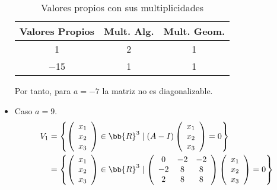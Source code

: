 \begin{ejercicio}
\begin{itemize}
           \begin{table}[H]
                \centering
                \begin{tabular}{c|c|c}
                    Valores Propios & Mult. Alg. & Mult. Geom. \\ \hline 
                    1 & 2 & 1\\
                    $-$15 & 1 & 1\\
                \end{tabular}
                \caption{Valores propios con sus multiplicidades}
            \end{table}
            Por tanto, para $a=-7$ la matriz no es diagonalizable.
            
        \item Caso $a=9$.
           \begin{equation*}\begin{split}
               V_{1} & = \left\{ \left(\begin{array}{c}
                    x_1 \\
                    x_2 \\
                    x_3
               \end{array}\right) \in \bb{R}^3 \mid (A-I)\left(\begin{array}{c}
                    x_1 \\
                    x_2 \\
                    x_3
               \end{array}\right) = 0 \right\} \\
               & = \left\{ \left(\begin{array}{c}
                    x_1 \\
                    x_2 \\
                    x_3
               \end{array}\right) \in \bb{R}^3 \mid \left( \begin{array}{ccc}
                0 & -2 & -2 \\
                -2 & 8 & 8 \\
                2 & 8 & 8 \\
            \end{array}\right) \left(\begin{array}{c}
                    x_1 \\
                    x_2 \\
                    x_3
               \end{array}\right) = 0 \right\} \\

\end{split}
\end{equation*}
\end{itemize}
\end{ejercicio}
